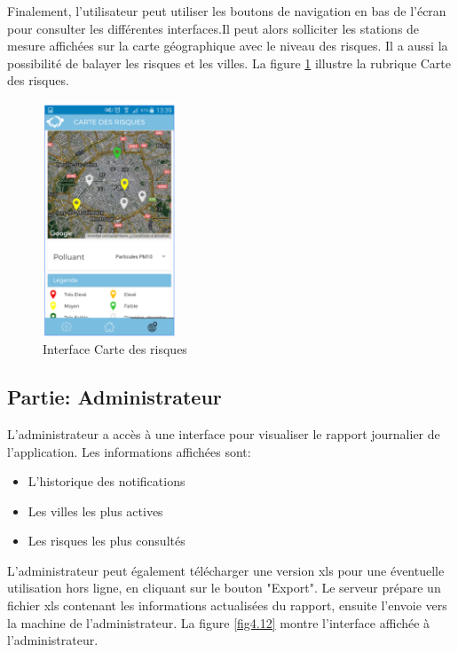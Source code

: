 Finalement, l'utilisateur peut utiliser les boutons de navigation en bas de l'écran pour consulter les différentes interfaces.Il peut alors solliciter les stations de mesure affichées sur la carte géographique avec le niveau des risques. Il a aussi la possibilité de balayer les risques et les villes. La figure \ref{fig4.11} illustre la rubrique Carte des risques.
\begin{figure}[!h]
	\begin{center}
		\includegraphics[height=7cm]{figures/station}
	\end{center}
	\caption{Interface Carte des risques}
	\label{fig4.11}
\end{figure}
 
\subsection{Partie: Administrateur}

\qquad L'administrateur a accès à une interface pour visualiser le rapport journalier de l'application. Les informations affichées sont: 
\begin{itemize}
	\item L'historique des notifications
	\item Les villes les plus actives
	\item Les risques les plus consultés
\end{itemize}

L'administrateur peut également télécharger une version xls pour une éventuelle utilisation hors ligne, en cliquant sur le bouton "Export". Le serveur prépare un fichier xls contenant les informations actualisées du rapport, ensuite l'envoie vers la machine de l'administrateur.
La figure \ref{fig4.12} montre l'interface affichée à l'administrateur.

